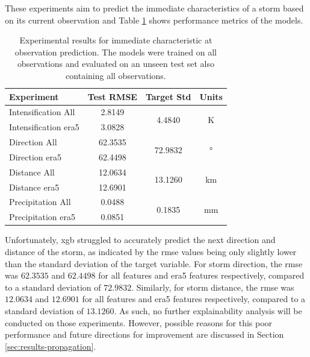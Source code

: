 These experiments aim to predict the immediate characteristics of a storm based on its current observation and Table \ref{tab:obs_experiment_results} shows performance metrics of the models. 

\begin{table}[h!]
\centering
\caption{Experimental results for immediate characteristic at observation prediction. The models were trained on all observations and evaluated on an unseen test set also containing all observations.}
\label{tab:obs_experiment_results}
\begin{tabular}{lccc}
\hline
\textbf{Experiment} & \textbf{Test RMSE} & \textbf{Target Std} & \textbf{Units} \\
\hline
Intensification All & 2.8149  & \multirow{2}{*}{4.4840}  & \multirow{2}{*}{\unit{\kelvin}} \\
Intensification \acrshort{era5} & 3.0828  & &  \\ \hline
Direction All & 62.3535 & \multirow{2}{*}{72.9832} & \multirow{2}{*}{\unit{\degree}} \\
Direction \acrshort{era5} & 62.4498 & & \\ \hline
Distance All & 12.0634 & \multirow{2}{*}{13.1260} & \multirow{2}{*}{\unit{\km}} \\
Distance \acrshort{era5} & 12.6901 & & \\ \hline
Precipitation All & 0.0488  & \multirow{2}{*}{0.1835}  & \multirow{2}{*}{\unit{\milli\meter}} \\
Precipitation \acrshort{era5} & 0.0851  & & \\
\hline
\end{tabular}
\end{table}

Unfortunately, \acrshort{xgb} struggled to accurately predict the next direction and distance of the storm, as indicated by the \acrshort{rmse} values being only slightly lower than the standard deviation of the target variable. For storm direction, the \acrshort{rmse} was $62.3535$ and $62.4498$ for all features and \acrshort{era5} features respectively, compared to a standard deviation of $72.9832$. Similarly, for storm distance, the \acrshort{rmse} was $12.0634$ and $12.6901$ for all features and \acrshort{era5} features respectively, compared to a standard deviation of $13.1260$. As such, no further explainability analysis will be conducted on those experiments. However, possible reasons for this poor performance and future directions for improvement are discussed in Section \ref{sec:results-propagation}.

